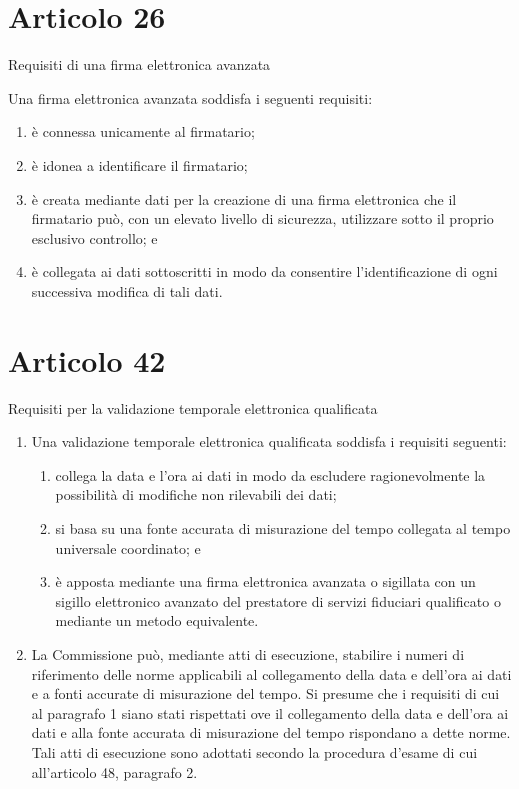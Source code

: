 \section{Articolo 26}\label{sec:articolo26reg9102014}
Requisiti di una firma elettronica avanzata\par 
Una firma elettronica avanzata soddisfa i seguenti requisiti:
\begin{enumerate}
	\item 	
	è connessa unicamente al firmatario;
	\item 	
	è idonea a identificare il firmatario;
	\item è creata mediante dati per la creazione di una firma elettronica che il firmatario può, con un elevato livello di sicurezza, utilizzare sotto il proprio esclusivo controllo; e
	\item è collegata ai dati sottoscritti in modo da consentire l’identificazione di ogni successiva modifica di tali dati.
\end{enumerate}
\section{Articolo 42}\label{sec:articolo42reg9102014}
Requisiti per la validazione temporale elettronica qualificata
\begin{enumerate}
	\item Una validazione temporale elettronica qualificata soddisfa i requisiti seguenti:
	\begin{enumerate}
		\item collega la data e l’ora ai dati in modo da escludere ragionevolmente la possibilità di modifiche non rilevabili dei dati;
		\item si basa su una fonte accurata di misurazione del tempo collegata al tempo universale coordinato; e
		\item è apposta mediante una firma elettronica avanzata o sigillata con un sigillo elettronico avanzato del prestatore di servizi fiduciari qualificato o mediante un metodo equivalente.
	\end{enumerate}
\item La Commissione può, mediante atti di esecuzione, stabilire i numeri di riferimento delle norme applicabili al collegamento della data e dell’ora ai dati e a fonti accurate di misurazione del tempo. Si presume che i requisiti di cui al paragrafo 1 siano stati rispettati ove il collegamento della data e dell’ora ai dati e alla fonte accurata di misurazione del tempo rispondano a dette norme. Tali atti di esecuzione sono adottati secondo la procedura d’esame di cui all’articolo 48, paragrafo 2.
\end{enumerate}
